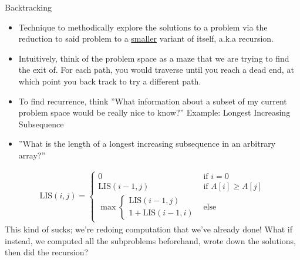 \documentclass{beamer}
\begin{document}
\begin{frame}[t]{Backtracking}
    \begin{itemize}
        \item Technique to methodically explore the solutions to a problem via the reduction to said problem to a \underline{smaller} variant of itself, a.k.a \alert{recursion}. 
        \item Intuitively, think of the problem space as a maze that we are trying to find the exit of. For each path, you would traverse until you reach a dead end, at which point you \alert{back track} to try a different path.
        \item To find recurrence, think ''What information about a subset of my current problem space would be really nice to know?''
    \pause
    \alert{Example:} Longest Increasing Subsequence
        \item ''What is the length of a longest increasing subsequence in an arbitrary array?''
    \end{itemize}
    \pause
    \begin{align*}
        \text{LIS}(i, j) = \begin{cases}
        0 & \text{if } i = 0 \\
        \text{LIS}(i - 1, j) & \text{if } A[i] \geq A[j] \\
        \max \begin{cases}
            \text{LIS}(i -1, j) \\
            1 + \text{LIS}(i - 1, i)
        \end{cases} & \text{else}
    \end{cases}
    \end{align*}
    \pause
    This kind of sucks; we're redoing computation that we've already done! What if instead, we computed all the subproblems beforehand, wrote down the solutions, then did the recursion?
\end{frame}
\end{document}
